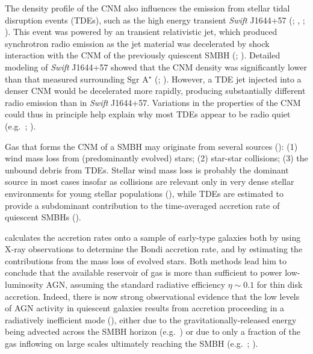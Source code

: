 \documentclass[usenatbib,fleqn]{mn2e}
\begin{document}
The density profile of the CNM also influences the emission from stellar tidal disruption events (TDEs), such as the high energy transient {\it Swift} J1644+57 (\citealt{Levan+11}; \citealt{Bloom+11}, \citealt{Burrows+11}; \citealt{Zauderer+11}).  This event was powered by an transient relativistic jet, which produced synchrotron radio emission as the jet material was decelerated by shock interaction with the CNM of the previously quiescent SMBH (\citealt{Giannios&Metzger11}; \citealt{Zauderer+11}).  Detailed modeling of {\it Swift} J1644+57 showed that the CNM density was significantly lower than that measured surrounding Sgr A$^{\star}$ (\citealt{Metzger+12}; \citealt{Berger+12}).  However, a TDE jet injected into a denser CNM would be decelerated more rapidly, producing substantially different radio emission than in {\it Swift} J1644+57.  Variations in the properties of the CNM could thus in principle help explain why most TDEs appear to be radio quiet (e.g.~\citealt{Bower+13}; \citealt{VanVelzen+13}).

Gas that forms the CNM of a SMBH may originate from several sources (\citealt{Ho:2009a}): (1) wind mass loss from (predominantly evolved) stars; (2) star-star collisions; (3) the unbound debris from TDEs.  Stellar wind mass loss is probably the dominant source in most cases insofar as collisions are relevant only in very dense stellar environments for young stellar populations (\citealt{Rubin&Loeb11}), while TDEs are estimated to provide a subdominant contribution to the time-averaged accretion rate of quiescent SMBHs (\citealt{MacLeod+13}).  

\citet{Ho:2009a} calculates the accretion rates onto a sample of early-type galaxies both by using X-ray observations to determine the Bondi accretion rate, and by estimating the contributions from the mass loss of evolved stars.  Both methods lead him to conclude that the available reservoir of gas is more than sufficient to power low-luminosity AGN, assuming the standard radiative efficiency $\eta \sim 0.1$ for thin disk accretion.  Indeed, there is now strong observational evidence that the low levels of AGN activity in quiescent galaxies results from accretion proceeding in a radiatively inefficient mode (\citealt{Yuan&Narayan14}), either due to the gravitationally-released energy being advected across the SMBH horizon (e.g.~\citealt{Narayan&Yi95}) or due to only a fraction of the gas inflowing on large scales ultimately reaching the SMBH (e.g.~\citealt{Blandford&Begelman99}; \citealt{Li+13}).    
\end{document}
